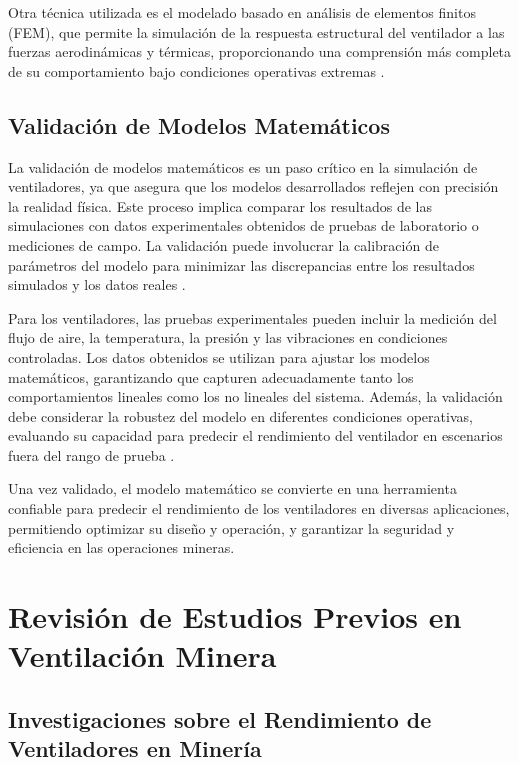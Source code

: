 Otra técnica utilizada es el modelado basado en análisis de elementos finitos (FEM), que permite la simulación de la respuesta estructural del ventilador a las fuerzas aerodinámicas y térmicas, proporcionando una comprensión más completa de su comportamiento bajo condiciones operativas extremas \cite{zienkiewicz2005finite}.

\subsection{Validación de Modelos Matemáticos}

La validación de modelos matemáticos es un paso crítico en la simulación de ventiladores, ya que asegura que los modelos desarrollados reflejen con precisión la realidad física. Este proceso implica comparar los resultados de las simulaciones con datos experimentales obtenidos de pruebas de laboratorio o mediciones de campo. La validación puede involucrar la calibración de parámetros del modelo para minimizar las discrepancias entre los resultados simulados y los datos reales \cite{oberkampf2010verification}.

Para los ventiladores, las pruebas experimentales pueden incluir la medición del flujo de aire, la temperatura, la presión y las vibraciones en condiciones controladas. Los datos obtenidos se utilizan para ajustar los modelos matemáticos, garantizando que capturen adecuadamente tanto los comportamientos lineales como los no lineales del sistema. Además, la validación debe considerar la robustez del modelo en diferentes condiciones operativas, evaluando su capacidad para predecir el rendimiento del ventilador en escenarios fuera del rango de prueba \cite{roache1998verification}.

Una vez validado, el modelo matemático se convierte en una herramienta confiable para predecir el rendimiento de los ventiladores en diversas aplicaciones, permitiendo optimizar su diseño y operación, y garantizar la seguridad y eficiencia en las operaciones mineras.



\section{Revisión de Estudios Previos en Ventilación Minera}

\subsection{Investigaciones sobre el Rendimiento de Ventiladores en Minería}

